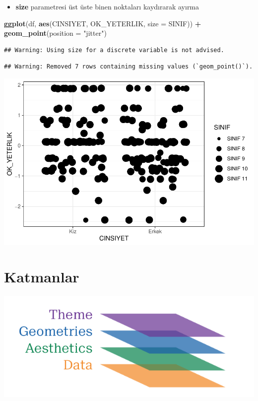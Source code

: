 \documentclass[
  oneside]{book}
\newenvironment{Shaded}{\begin{snugshade}}{\end{snugshade}}
\newcommand{\AttributeTok}[1]{\textcolor[rgb]{0.13,0.29,0.53}{#1}}
\newcommand{\FunctionTok}[1]{\textcolor[rgb]{0.13,0.29,0.53}{\textbf{#1}}}
\newcommand{\NormalTok}[1]{#1}
\newcommand{\SpecialCharTok}[1]{\textcolor[rgb]{0.81,0.36,0.00}{\textbf{#1}}}
\newcommand{\StringTok}[1]{\textcolor[rgb]{0.31,0.60,0.02}{#1}}
\providecommand{\tightlist}{%
  \setlength{\itemsep}{0pt}\setlength{\parskip}{0pt}}
\begin{document}
\begin{itemize}
\tightlist
\item
  \textbf{size} parametresi üst üste binen noktaları kaydırarak ayırma
\end{itemize}

\begin{Shaded}
\begin{Highlighting}[]
\FunctionTok{ggplot}\NormalTok{(df, }\FunctionTok{aes}\NormalTok{(CINSIYET, OK\_YETERLIK, }\AttributeTok{size =}\NormalTok{ SINIF)) }\SpecialCharTok{+}
  \FunctionTok{geom\_point}\NormalTok{(}\AttributeTok{position =} \StringTok{"jitter"}\NormalTok{)}
\end{Highlighting}
\end{Shaded}

\begin{verbatim}
## Warning: Using size for a discrete variable is not advised.
\end{verbatim}

\begin{verbatim}
## Warning: Removed 7 rows containing missing values (`geom_point()`).
\end{verbatim}

\begin{center}\includegraphics[width=1\linewidth]{15-betimleyici-istatistik_files/figure-latex/unnamed-chunk-46-1} \end{center}

\hypertarget{katmanlar}{%
\section{Katmanlar}\label{katmanlar}}

\includegraphics{images/v4.PNG}
\end{document}
